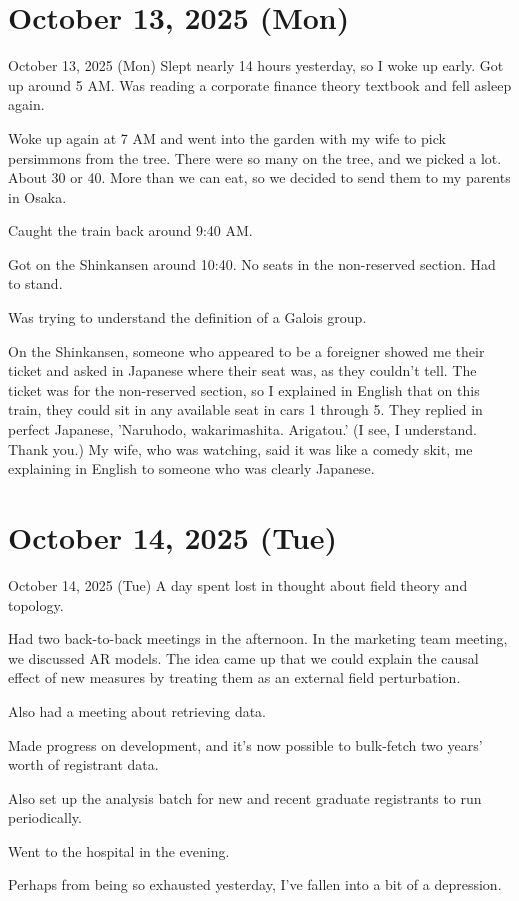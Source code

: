 \documentclass[dvipdfmx, autodetect-engine, aspectratio=169, 10.5pt]{beamer}
\begin{document}
\section{October 13, 2025 (Mon)}

\begin{frame}{October 13, 2025 (Mon)}
\scriptsize
Slept nearly 14 hours yesterday, so I woke up early. Got up around 5 AM.
Was reading a corporate finance theory textbook and fell asleep again.

Woke up again at 7 AM and went into the garden with my wife to pick persimmons from the tree.
There were so many on the tree, and we picked a lot. About 30 or 40.
More than we can eat, so we decided to send them to my parents in Osaka.

Caught the train back around 9:40 AM.

Got on the Shinkansen around 10:40. No seats in the non-reserved section.
Had to stand.

Was trying to understand the definition of a Galois group.

On the Shinkansen, someone who appeared to be a foreigner showed me their ticket and asked in Japanese where their seat was, as they couldn't tell.
The ticket was for the non-reserved section, so I explained in English that on this train, they could sit in any available seat in cars 1 through 5.
They replied in perfect Japanese, 'Naruhodo, wakarimashita. Arigatou.' (I see, I understand. Thank you.)
My wife, who was watching, said it was like a comedy skit, me explaining in English to someone who was clearly Japanese.
\end{frame}

\section{October 14, 2025 (Tue)}

\begin{frame}{October 14, 2025 (Tue)}
A day spent lost in thought about field theory and topology.

Had two back-to-back meetings in the afternoon.
In the marketing team meeting, we discussed AR models.
The idea came up that we could explain the causal effect of new measures by treating them as an external field perturbation.

Also had a meeting about retrieving data.

Made progress on development, and it's now possible to bulk-fetch two years' worth of registrant data.

Also set up the analysis batch for new and recent graduate registrants to run periodically.

Went to the hospital in the evening.

Perhaps from being so exhausted yesterday, I've fallen into a bit of a depression.
\end{frame}
\end{document}
